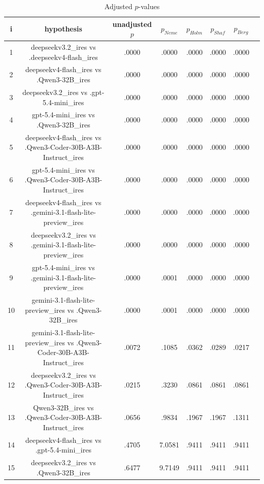 \documentclass[a4paper,10pt]{article}
\begin{document}
\begin{landscape}
\begin{table}[!htp]
\centering\tiny
\caption{Adjusted $p$-values}
\begin{tabular}{cccccccc}
i&hypothesis&unadjusted $p$&$p_{Neme}$&$p_{Holm}$&$p_{Shaf}$&$p_{Berg}$\\
\hline
1&deepseekv3.2_ires vs .deepseekv4-flash_ires&.0000&.0000&.0000&.0000&.0000\\2&deepseekv4-flash_ires vs .Qwen3-32B_ires&.0000&.0000&.0000&.0000&.0000\\3&deepseekv3.2_ires vs .gpt-5.4-mini_ires&.0000&.0000&.0000&.0000&.0000\\4&gpt-5.4-mini_ires vs .Qwen3-32B_ires&.0000&.0000&.0000&.0000&.0000\\5&deepseekv4-flash_ires vs .Qwen3-Coder-30B-A3B-Instruct_ires&.0000&.0000&.0000&.0000&.0000\\6&gpt-5.4-mini_ires vs .Qwen3-Coder-30B-A3B-Instruct_ires&.0000&.0000&.0000&.0000&.0000\\7&deepseekv4-flash_ires vs .gemini-3.1-flash-lite-preview_ires&.0000&.0000&.0000&.0000&.0000\\8&deepseekv3.2_ires vs .gemini-3.1-flash-lite-preview_ires&.0000&.0000&.0000&.0000&.0000\\9&gpt-5.4-mini_ires vs .gemini-3.1-flash-lite-preview_ires&.0000&.0001&.0000&.0000&.0000\\10&gemini-3.1-flash-lite-preview_ires vs .Qwen3-32B_ires&.0000&.0001&.0000&.0000&.0000\\11&gemini-3.1-flash-lite-preview_ires vs .Qwen3-Coder-30B-A3B-Instruct_ires&.0072&.1085&.0362&.0289&.0217\\12&deepseekv3.2_ires vs .Qwen3-Coder-30B-A3B-Instruct_ires&.0215&.3230&.0861&.0861&.0861\\13&Qwen3-32B_ires vs .Qwen3-Coder-30B-A3B-Instruct_ires&.0656&.9834&.1967&.1967&.1311\\14&deepseekv4-flash_ires vs .gpt-5.4-mini_ires&.4705&7.0581&.9411&.9411&.9411\\15&deepseekv3.2_ires vs .Qwen3-32B_ires&.6477&9.7149&.9411&.9411&.9411\\\hline
\end{tabular}
\end{table}

\end{landscape}
\end{document}
